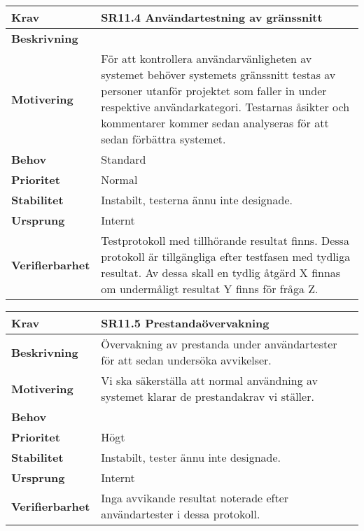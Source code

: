 \documentclass[a4paper, twoside, 11pt, titlepage]{article}
\begin{document}
\begin{tabular} { p{2.6cm} p{12.5cm} }
	\hline
	\sffamily\textbf{Krav} & \sffamily\textbf{SR11.4 Användartestning av gränssnitt  } \\
	\hline
	\sffamily\textbf{Beskrivning} &    \\
	\hline
	\sffamily\textbf{Motivering} &  För att kontrollera användarvänligheten av systemet behöver systemets gränssnitt testas av personer utanför projektet som faller in under respektive användarkategori. Testarnas åsikter och kommentarer kommer sedan analyseras för att sedan förbättra systemet.  \\
	\hline
	\sffamily\textbf{Behov} &  Standard   \\
	\hline
	\sffamily\textbf{Prioritet} &  Normal  \\
	\hline
	\sffamily\textbf{Stabilitet} &  Instabilt, testerna ännu inte designade.   \\
	\hline
	\sffamily\textbf{Ursprung} &  Internt   \\
	\hline
	\sffamily\textbf{Verifierbarhet} &  Testprotokoll med tillhörande resultat finns. Dessa protokoll är tillgängliga efter testfasen med tydliga resultat. Av dessa skall en tydlig åtgärd X finnas om undermåligt resultat Y finns för fråga Z.   \\
	\hline
\end{tabular}
\vspace{6mm}

\begin{tabular} { p{2.6cm} p{12.5cm} }
	\hline
	\sffamily\textbf{Krav} & \sffamily\textbf{SR11.5 Prestandaövervakning } \\
	\hline
	\sffamily\textbf{Beskrivning} &  Övervakning av prestanda under användartester för att sedan undersöka avvikelser.   \\
	\hline
	\sffamily\textbf{Motivering} &  Vi ska säkerställa att normal användning av systemet klarar de prestandakrav vi ställer.   \\
	\hline
	\sffamily\textbf{Behov} &   \\
	\hline
	\sffamily\textbf{Prioritet} &  Högt  \\
	\hline
	\sffamily\textbf{Stabilitet} &  Instabilt, tester ännu inte designade.   \\
	\hline
	\sffamily\textbf{Ursprung} &  Internt   \\
	\hline
	\sffamily\textbf{Verifierbarhet} &  Inga avvikande resultat noterade efter användartester i dessa protokoll.   \\
	\hline
\end{tabular}
\vspace{6mm}
\end{document}
